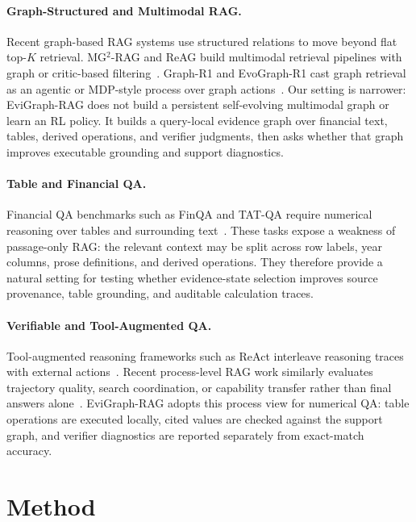 \documentclass[letterpaper]{article}
\begin{document}
\paragraph{Graph-Structured and Multimodal RAG.}
Recent graph-based RAG systems use structured relations to move beyond flat top-\(K\) retrieval.
MG\({}^2\)-RAG and ReAG build multimodal retrieval pipelines with graph or critic-based filtering~\cite{dai2026mg2rag,compagnoni2026reag}.
Graph-R1 and EvoGraph-R1 cast graph retrieval as an agentic or MDP-style process over graph actions~\cite{luo2026graphr1,lin2026evographr1}.
Our setting is narrower: EviGraph-RAG does not build a persistent self-evolving multimodal graph or learn an RL policy.
It builds a query-local evidence graph over financial text, tables, derived operations, and verifier judgments, then asks whether that graph improves executable grounding and support diagnostics.

\paragraph{Table and Financial QA.}
Financial QA benchmarks such as FinQA and TAT-QA require numerical reasoning over tables and surrounding text~\cite{chen2021finqa,zhu2021tatqa}.
These tasks expose a weakness of passage-only RAG: the relevant context may be split across row labels, year columns, prose definitions, and derived operations.
They therefore provide a natural setting for testing whether evidence-state selection improves source provenance, table grounding, and auditable calculation traces.

\paragraph{Verifiable and Tool-Augmented QA.}
Tool-augmented reasoning frameworks such as ReAct interleave reasoning traces with external actions~\cite{yao2023react}.
Recent process-level RAG work similarly evaluates trajectory quality, search coordination, or capability transfer rather than final answers alone~\cite{li2026mcsearch,kotoge2026dgpo}.
EviGraph-RAG adopts this process view for numerical QA: table operations are executed locally, cited values are checked against the support graph, and verifier diagnostics are reported separately from exact-match accuracy.

\section{Method}
\end{document}
